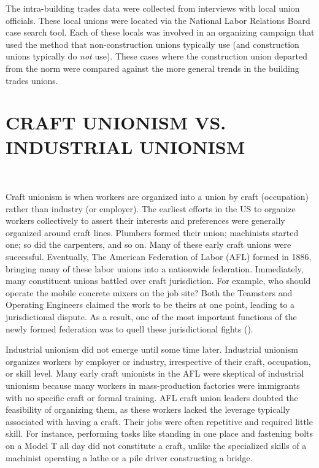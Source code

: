 \documentclass[12pt]{article}
\begin{document}
The intra-building trades data were collected from interviews with local union officials. These local unions were located via the National Labor Relations Board case search tool. Each of these locals was involved in an organizing campaign that used the method that non-construction unions typically use (and construction unions typically do \textit{not} use). These cases where the construction union departed from the norm were compared against the more general trends in the building trades unions.

\section{CRAFT UNIONISM VS. INDUSTRIAL UNIONISM} \

Craft unionism is when workers are organized into a union by craft (occupation) rather than industry (or employer). The earliest efforts in the US to organize workers collectively to assert their interests and preferences were generally organized around craft lines. Plumbers formed their union; machinists started one; so did the carpenters, and so on. Many of these early craft unions were successful. Eventually, The American Federation of Labor (AFL) formed in 1886, bringing many of these labor unions into a nationwide federation. Immediately, many constituent unions battled over craft jurisdiction. For example, who should operate the mobile concrete mixers on the job site? Both the Teamsters and Operating Engineers claimed the work to be theirs at one point, leading to a jurisdictional dispute. As a result, one of the most important functions of the newly formed federation was to quell these jurisdictional fights (\cite{jaffe1940}).


Industrial unionism did not emerge until some time later. Industrial unionism organizes workers by employer or industry, irrespective of their craft, occupation, or skill level. Many early craft unionists in the AFL were skeptical of industrial unionism because many workers in mass-production factories were immigrants with no specific craft or formal training. AFL craft union leaders doubted the feasibility of organizing them, as these workers lacked the leverage typically associated with having a craft. Their jobs were often repetitive and required little skill. For instance, performing tasks like standing in one place and fastening bolts on a Model T all day did not constitute a craft, unlike the specialized skills of a machinist operating a lathe or a pile driver constructing a bridge.
\end{document}
